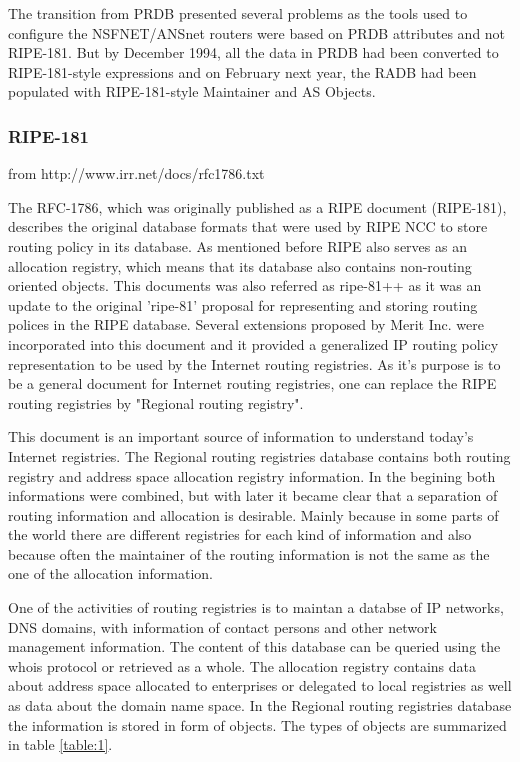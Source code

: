 \documentclass[11pt]{report}
\begin{document}
The transition from PRDB presented several problems as the tools used to configure the NSFNET/ANSnet routers were based on PRDB attributes and not RIPE-181. But by December 1994, all the data in PRDB had been converted to RIPE-181-style expressions and on February next year, the RADB had been populated with RIPE-181-style Maintainer and AS Objects. 

\subsubsection{RIPE-181}
from http://www.irr.net/docs/rfc1786.txt


The RFC-1786, which was originally published as a RIPE document (RIPE-181), describes the original database formats that were used by RIPE NCC to store routing policy in its database. As mentioned before RIPE also serves as an allocation registry, which means that its database also contains non-routing oriented objects. 
This documents was also referred as ripe-81++ as it was an update to the original 'ripe-81' proposal for representing and storing routing polices in the RIPE database. Several extensions proposed by Merit Inc. were incorporated into this document and it provided a generalized IP routing policy representation to be used by the Internet routing registries. As it's purpose is to be a general document for Internet routing registries, one can replace the RIPE routing registries by "Regional routing registry".

This document is an important source of information to understand today's Internet registries. 
The Regional routing registries database contains both routing registry and address space allocation registry information. In the begining both informations were combined, but with later it became clear that a separation
of routing information and allocation is desirable. Mainly because in some parts of the world there are different registries for each kind of information and also because often the maintainer of the routing information is not the same as the one of the allocation information.

One of the activities of routing registries is to maintan a databse of IP networks, DNS domains, with information of contact persons and other network management information. The content of this database can be queried using the whois protocol or retrieved as a whole.
The allocation registry contains data about address space allocated to enterprises or delegated to local registries as well as data about the domain name space. 
In the Regional routing registries database the information is stored in form of objects. The types of objects are summarized in table \ref{table:1}.   
   
\end{document}
